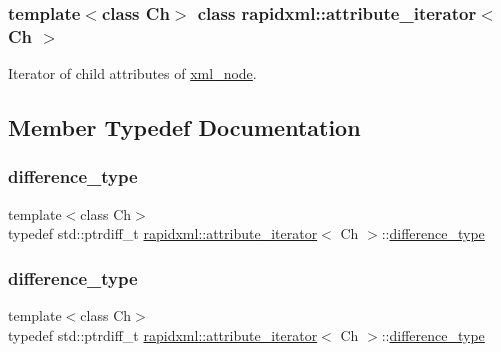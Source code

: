 \subsubsection*{template$<$class Ch$>$\newline
class rapidxml\+::attribute\+\_\+iterator$<$ Ch $>$}

Iterator of child attributes of \mbox{\hyperlink{classrapidxml_1_1xml__node}{xml\+\_\+node}}. 

\subsection{Member Typedef Documentation}
\mbox{\label{classrapidxml_1_1attribute__iterator_accfd6d8527d32b427496b42f71a2e37a}} 
\subsubsection{\texorpdfstring{difference\+\_\+type}{difference\_type}\hspace{0.1cm}{\footnotesize\ttfamily [1/2]}}
{\footnotesize\ttfamily template$<$class Ch$>$ \\
typedef std\+::ptrdiff\+\_\+t \mbox{\hyperlink{classrapidxml_1_1attribute__iterator}{rapidxml\+::attribute\+\_\+iterator}}$<$ Ch $>$\+::\mbox{\hyperlink{classrapidxml_1_1attribute__iterator_accfd6d8527d32b427496b42f71a2e37a}{difference\+\_\+type}}}

\mbox{\label{classrapidxml_1_1attribute__iterator_accfd6d8527d32b427496b42f71a2e37a}} 
\subsubsection{\texorpdfstring{difference\+\_\+type}{difference\_type}\hspace{0.1cm}{\footnotesize\ttfamily [2/2]}}
{\footnotesize\ttfamily template$<$class Ch$>$ \\
typedef std\+::ptrdiff\+\_\+t \mbox{\hyperlink{classrapidxml_1_1attribute__iterator}{rapidxml\+::attribute\+\_\+iterator}}$<$ Ch $>$\+::\mbox{\hyperlink{classrapidxml_1_1attribute__iterator_accfd6d8527d32b427496b42f71a2e37a}{difference\+\_\+type}}}

